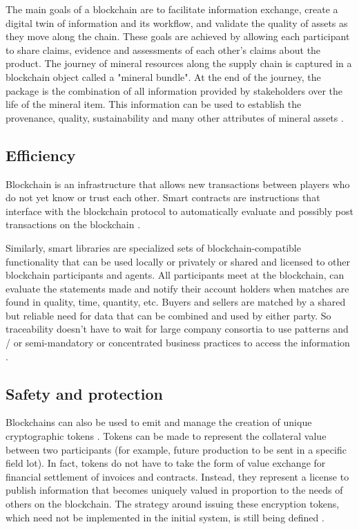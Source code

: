 The main goals of a blockchain are to facilitate information exchange, create a digital twin of information and its workflow, and validate the quality of assets as they move along the chain. These goals are achieved by allowing each participant to share claims, evidence and assessments of each other's claims about the product. The journey of mineral resources along the supply chain is captured in a blockchain object called a "mineral bundle". At the end of the journey, the package is the combination of all information provided by stakeholders over the life of the mineral item. This information can be used to establish the provenance, quality, sustainability and many other attributes of mineral assets \cite{martin2017technology}.

\subsection{Efficiency}\label{sec:efficiency}
Blockchain is an infrastructure that allows new transactions between players who do not yet know or trust each other. Smart contracts are instructions that interface with the blockchain protocol to automatically evaluate and possibly post transactions on the blockchain \cite{raskin2017law}. 

Similarly, smart libraries are specialized sets of blockchain-compatible functionality that can be used locally or privately or shared and licensed to other blockchain participants and agents. All participants meet at the blockchain, can evaluate the statements made and notify their account holders when matches are found in quality, time, quantity, etc. Buyers and sellers are matched by a shared but reliable need for data that can be combined and used by either party. So traceability doesn't have to wait for large company consortia to use patterns and / or semi-mandatory or concentrated business practices to access the information \cite{galvez2018future}.

\subsection{Safety and protection}\label{sec:Safety}
Blockchains can also be used to emit and manage the creation of unique cryptographic tokens \cite{nystrom1999pkcs}. Tokens can be made to represent the collateral value between two participants (for example, future production to be sent in a specific field lot). In fact, tokens do not have to take the form of value exchange for financial settlement of invoices and contracts. Instead, they represent a license to publish information that becomes uniquely valued in proportion to the needs of others on the blockchain. The strategy around issuing these encryption tokens, which need not be implemented in the initial system, is still being defined \cite{galvez2018future}.

